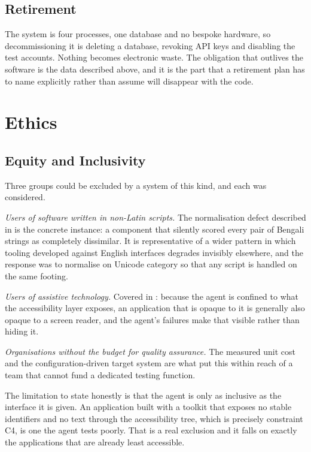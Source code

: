 \subsection*{Retirement}

The system is four processes, one database and no bespoke hardware, so
decommissioning it is deleting a database, revoking API keys and disabling the
test accounts. Nothing becomes electronic waste. The obligation that outlives
the software is the data described above, and it is the part that a retirement
plan has to name explicitly rather than assume will disappear with the code.

\section{Ethics}
\label{sec:ethics}

\subsection{Equity and Inclusivity}
\label{sec:equity}

Three groups could be excluded by a system of this kind, and each was
considered.

\emph{Users of software written in non-Latin scripts.} The normalisation defect
described in  is the concrete instance: a component that
silently scored every pair of Bengali strings as completely dissimilar. It is
representative of a wider pattern in which tooling developed against English
interfaces degrades invisibly elsewhere, and the response was to normalise on
Unicode category so that any script is handled on the same footing.

\emph{Users of assistive technology.} Covered in : because
the agent is confined to what the accessibility layer exposes, an application
that is opaque to it is generally also opaque to a screen reader, and the
agent's failures make that visible rather than hiding it.

\emph{Organisations without the budget for quality assurance.} The measured
unit cost and the configuration-driven target system are what put this within
reach of a team that cannot fund a dedicated testing function.

The limitation to state honestly is that the agent is only as inclusive as the
interface it is given. An application built with a toolkit that exposes no
stable identifiers and no text through the accessibility tree, which is
precisely constraint C4, is one the agent tests poorly. That is a real
exclusion and it falls on exactly the applications that are already least
accessible.

